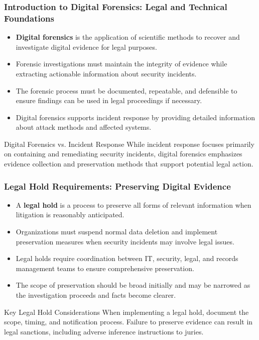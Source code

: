 \documentclass{beamer}
\begin{document}
\begin{frame}
\frametitle{Introduction to Digital Forensics: Legal and Technical Foundations}
\begin{itemize}
\item \textbf{Digital forensics} is the application of scientific methods to recover and investigate digital evidence for legal purposes.
\item Forensic investigations must maintain the integrity of evidence while extracting actionable information about security incidents.
\item The forensic process must be documented, repeatable, and defensible to ensure findings can be used in legal proceedings if necessary.
\item Digital forensics supports incident response by providing detailed information about attack methods and affected systems.
\end{itemize}

\begin{block}{Digital Forensics vs. Incident Response}
\scriptsize
While incident response focuses primarily on containing and remediating security incidents, digital forensics emphasizes evidence collection and preservation methods that support potential legal action.
\end{block}
\end{frame}

\begin{frame}
\frametitle{Legal Hold Requirements: Preserving Digital Evidence}
\begin{itemize}
\item A \textbf{legal hold} is a process to preserve all forms of relevant information when litigation is reasonably anticipated.
\item Organizations must suspend normal data deletion and implement preservation measures when security incidents may involve legal issues.
\item Legal holds require coordination between IT, security, legal, and records management teams to ensure comprehensive preservation.
\item The scope of preservation should be broad initially and may be narrowed as the investigation proceeds and facts become clearer.
\end{itemize}

\begin{alertblock}{Key Legal Hold Considerations}
\scriptsize
When implementing a legal hold, document the scope, timing, and notification process. Failure to preserve evidence can result in legal sanctions, including adverse inference instructions to juries.
\end{alertblock}
\end{frame}
\end{document}
